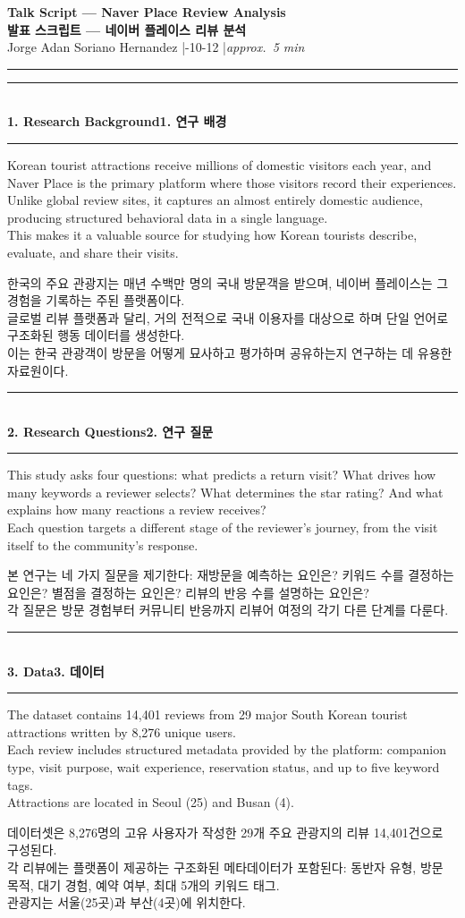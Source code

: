 \documentclass[10pt,a4paper]{article}
\newcommand{\sechead}[2]{%
  \vspace{6pt}%
  \noindent\rule{\linewidth}{0.6pt}\\[1pt]
  {\small\bfseries #1\hfill #2}\\[-3pt]
  \rule{\linewidth}{0.4pt}\par\vspace{2pt}%
}
\newcommand{\sent}[1]{#1\\[5pt]}
\newcommand{\bilingual}[2]{%
  \noindent%
  \begin{minipage}[t]{0.485\linewidth}
    \small #1
  \end{minipage}\hfill\vrule\hfill%
  \begin{minipage}[t]{0.483\linewidth}
    \small #2
  \end{minipage}\par\vspace{4pt}%
}
\begin{document}
\begin{center}
  {\large\bfseries Talk Script --- Naver Place Review Analysis}\\[3pt]
  {\large\bfseries 발표 스크립트 --- 네이버 플레이스 리뷰 분석}\\[2pt]
  {\small Jorge Adan Soriano Hernandez \quad|-10-12 \quad|\quad \textit{approx.\ 5 min}}
\end{center}
\rule{\linewidth}{0.8pt}

\sechead{1. Research Background}{1. 연구 배경}
\bilingual{%
  \sent{Korean tourist attractions receive millions of domestic visitors each year, and Naver Place is the primary platform where those visitors record their experiences.}
  \sent{Unlike global review sites, it captures an almost entirely domestic audience, producing structured behavioral data in a single language.}
  \sent{This makes it a valuable source for studying how Korean tourists describe, evaluate, and share their visits.}
}{%
  \sent{한국의 주요 관광지는 매년 수백만 명의 국내 방문객을 받으며, 네이버 플레이스는 그 경험을 기록하는 주된 플랫폼이다.}
  \sent{글로벌 리뷰 플랫폼과 달리, 거의 전적으로 국내 이용자를 대상으로 하며 단일 언어로 구조화된 행동 데이터를 생성한다.}
  \sent{이는 한국 관광객이 방문을 어떻게 묘사하고 평가하며 공유하는지 연구하는 데 유용한 자료원이다.}
}

\sechead{2. Research Questions}{2. 연구 질문}
\bilingual{%
  \sent{This study asks four questions: what predicts a return visit? What drives how many keywords a reviewer selects? What determines the star rating? And what explains how many reactions a review receives?}
  \sent{Each question targets a different stage of the reviewer's journey, from the visit itself to the community's response.}
}{%
  \sent{본 연구는 네 가지 질문을 제기한다: 재방문을 예측하는 요인은? 키워드 수를 결정하는 요인은? 별점을 결정하는 요인은? 리뷰의 반응 수를 설명하는 요인은?}
  \sent{각 질문은 방문 경험부터 커뮤니티 반응까지 리뷰어 여정의 각기 다른 단계를 다룬다.}
}

\sechead{3. Data}{3. 데이터}
\bilingual{%
  \sent{The dataset contains 14,401 reviews from 29 major South Korean tourist attractions written by 8,276 unique users.}
  \sent{Each review includes structured metadata provided by the platform: companion type, visit purpose, wait experience, reservation status, and up to five keyword tags.}
  \sent{Attractions are located in Seoul (25) and Busan (4).}
}{%
  \sent{데이터셋은 8,276명의 고유 사용자가 작성한 29개 주요 관광지의 리뷰 14,401건으로 구성된다.}
  \sent{각 리뷰에는 플랫폼이 제공하는 구조화된 메타데이터가 포함된다: 동반자 유형, 방문 목적, 대기 경험, 예약 여부, 최대 5개의 키워드 태그.}
  \sent{관광지는 서울(25곳)과 부산(4곳)에 위치한다.}
}
\end{document}

